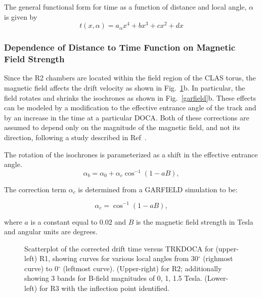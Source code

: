 The general functional form for time as a function of distance and local angle, $\alpha$
is given by
\begin{equation}
\label{tfunctionofxandlocalangle}
t(x,\alpha) = a_{\alpha} x^4 + b x^3 + c x^2 + d x
\end{equation}

\subsubsection{Dependence of Distance to Time Function on Magnetic Field Strength}
Since the R2 chambers are located within the field region of the CLAS torus, the 
magnetic field affects the drift velocity as shown in 
Fig.~\ref{xvst}b.  In particular, the field rotates and shrinks the isochrones
as shown in Fig.~\ref{garfield}b.  These effects can be modeled by a 
modification to the effective entrance angle of the track and by an increase 
in the time at a particular DOCA.  Both of these corrections are assumed to depend only on the 
magnitude of the magnetic field, and not its direction, following a study 
described in Ref~\cite{MM-IEEE}.  

The rotation of the isochrones is parameterized as a shift in the effective
entrance angle.  
\begin{equation} 
\label{eq-bcorrn-to-ang}
\alpha_b = \alpha_0 + \alpha_c \cos^{-1}(1 - a B), 
\end{equation}

The correction term $\alpha_c$ is determined from a 
GARFIELD simulation to be:

\begin{equation} 
\label{eq-bang}
\alpha_c = \cos^{-1}(1 - a B), 
\end{equation}

\noindent
where $a$ is a constant equal to $0.02$ and $B$ is the magnetic field strength in Tesla and angular
units are degrees.

\begin{figure}[htb]
\vspace{15.cm} 
\caption{\small{Scatterplot of the corrected drift time versus TRKDOCA for 
(upper-left) R1, showing curves for various local angles from 30$^{\circ}$
(righmost curve) to 0$^{\circ}$ (leftmost curve).  (Upper-right) for R2; 
additionally showing 3 bands for B-field magnitudes of 0, 1, 1.5 Tesla.
(Lower-left) for R3 with the inflection point identified.}}
\label{xvst}
\end{figure}


